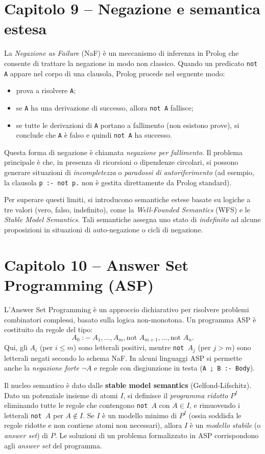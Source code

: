 \documentclass[12pt]{article}
\begin{document}
\section*{Capitolo 9 – Negazione e semantica estesa}

La \emph{Negazione as Failure} (NaF) è un meccanismo di inferenza in Prolog che consente di trattare la negazione in modo non classico. Quando un predicato \texttt{not A} appare nel corpo di una clausola, Prolog procede nel seguente modo:
\begin{itemize}
  \item prova a risolvere \texttt{A}; 
  \item se \texttt{A} ha una derivazione di successo, allora \texttt{not A} fallisce; 
  \item se tutte le derivazioni di \texttt{A} portano a fallimento (non esistono prove), si conclude che \texttt{A} è falso e quindi \texttt{not A} ha successo.
\end{itemize}
Questa forma di negazione è chiamata \emph{negazione per fallimento}. Il problema principale è che, in presenza di ricorsioni o dipendenze circolari, si possono generare situazioni di \emph{incompletezza} o \emph{paradossi di autoriferimento} (ad esempio, la clausola \texttt{p :- not p.} non è gestita direttamente da Prolog standard).

Per superare questi limiti, si introducono semantiche estese basate su logiche a tre valori (vero, falso, indefinito), come la \emph{Well-Founded Semantics} (WFS) e le \emph{Stable Model Semantics}. Tali semantiche assegna uno stato di \emph{indefinito} ad alcune proposizioni in situazioni di auto-negazione o cicli di negazione.

\section*{Capitolo 10 – Answer Set Programming (ASP)}

L'Answer Set Programming è un approccio dichiarativo per risolvere problemi combinatori complessi, basato sulla logica non-monotona. Un programma ASP è costituito da regole del tipo:
\[
  A_0 \; :- \; A_1, \dots, A_m, \text{not } A_{m+1}, \dots, \text{not } A_n.
\]
Qui, gli $A_i$ (per $i\leq m$) sono letterali positivi, mentre \texttt{not $A_j$} (per $j>m$) sono letterali negati secondo lo schema NaF. In alcuni linguaggi ASP si permette anche la \emph{negazione forte} $\neg A$ e regole con disgiunzione in testa (\texttt{A ; B :- Body}).

Il nucleo semantico è dato dalle \textbf{stable model semantics} (Gelfond-Lifschitz). Dato un potenziale insieme di atomi $I$, si definisce il \emph{programma ridotto} $P^I$ eliminando tutte le regole che contengono \texttt{not $A$} con $A\in I$, e rimuovendo i letterali \texttt{not $A$} per $A\notin I$. Se $I$ è un modello minimo di $P^I$ (ossia soddisfa le regole ridotte e non contiene atomi non necessari), allora $I$ è un \emph{modello stabile} (o \emph{answer set}) di $P$. Le soluzioni di un problema formalizzato in ASP corrispondono agli \emph{answer set} del programma.
\end{document}

